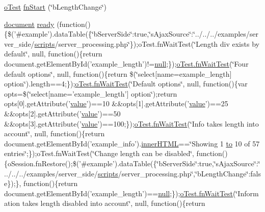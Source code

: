 \begin{DoxyCompactItemize}
\item 
\hyperlink{unit__test_8js_a3b2d259e2df3b6860d9047a92d09d0d6}{o\+Test} \hyperlink{4__server-side_2b_length_change_8js_a7903b4f0c46e3e59ad09c7b0e0f0e72a}{fn\+Start} (\char`\"{}b\+Length\+Change\char`\"{})
\item 
\hyperlink{outside_events_8js_aa14f8e0338cced6720590fd2ea13bd4b}{document} \hyperlink{4__server-side_2b_length_change_8js_a5ece6c457e0732046500cebbf338d1a3}{ready} (function()\{\$('\#example').data\+Table(\{\char`\"{}b\+Server\+Side\char`\"{}\+:true,\char`\"{}s\+Ajax\+Source\char`\"{}\+:\char`\"{}../../../examples/server\+\_\+side/\hyperlink{tinymce_8jquery_8dev_8js_a09066d4d580eeec222f858d588b4cdef}{scripts}/server\+\_\+processing.\+php\char`\"{}\});o\+Test.\+fn\+Wait\+Test(\char`\"{}Length div exists by default\char`\"{}, null, function()\{return document.\+get\+Element\+By\+Id('example\+\_\+length')!=\hyperlink{validate_8js_afb8e110345c45e74478894341ab6b28e}{null};\});\hyperlink{onhold_24__server-side_2__zero__config_8js_ab25c4d596771c0133cdc45178ce72c3d}{o\+Test.\+fn\+Wait\+Test}(\char`\"{}Four default options\char`\"{}, null, function()\{return \$(\char`\"{}select\mbox{[}name=example\+\_\+length\mbox{]} option\char`\"{}).length==4;\});\hyperlink{onhold_24__server-side_2__zero__config_8js_ab25c4d596771c0133cdc45178ce72c3d}{o\+Test.\+fn\+Wait\+Test}(\char`\"{}Default options\char`\"{}, null, function()\{var opts=\$(\char`\"{}select\mbox{[}name='example\+\_\+length'\mbox{]} option\char`\"{});return opts\mbox{[}0\mbox{]}.get\+Attribute('\hyperlink{fullpage_2plugin_8min_8js_ac56c57897e10f699d124e0103921aa20}{value}')==10 \&\&opts\mbox{[}1\mbox{]}.get\+Attribute('\hyperlink{fullpage_2plugin_8min_8js_ac56c57897e10f699d124e0103921aa20}{value}')==25 \&\&opts\mbox{[}2\mbox{]}.get\+Attribute('\hyperlink{fullpage_2plugin_8min_8js_ac56c57897e10f699d124e0103921aa20}{value}')==50 \&\&opts\mbox{[}3\mbox{]}.get\+Attribute('\hyperlink{fullpage_2plugin_8min_8js_ac56c57897e10f699d124e0103921aa20}{value}')==100;\});\hyperlink{onhold_24__server-side_2__zero__config_8js_ab25c4d596771c0133cdc45178ce72c3d}{o\+Test.\+fn\+Wait\+Test}(\char`\"{}Info takes length into account\char`\"{}, null, function()\{return document.\+get\+Element\+By\+Id('example\+\_\+info').\hyperlink{jquery-ui_8js_a87f73c4f0391c1cf9fe60374a76d9a7b}{inner\+H\+T\+M\+L}==\char`\"{}Showing 1 \hyperlink{jquery-ui_8js_af6086621f45baa2cf538f19e45d3c263}{to} 10 of 57 entries\char`\"{};\});o\+Test.\+fn\+Wait\+Test(\char`\"{}Change length can be disabled\char`\"{}, function()\{o\+Session.\+fn\+Restore();\$('\#example').data\+Table(\{\char`\"{}b\+Server\+Side\char`\"{}\+:true,\char`\"{}s\+Ajax\+Source\char`\"{}\+:\char`\"{}../../../examples/server\+\_\+side/\hyperlink{tinymce_8jquery_8dev_8js_a09066d4d580eeec222f858d588b4cdef}{scripts}/server\+\_\+processing.\+php\char`\"{},\char`\"{}b\+Length\+Change\char`\"{}\+:false\});\}, function()\{return document.\+get\+Element\+By\+Id('example\+\_\+length')==\hyperlink{validate_8js_afb8e110345c45e74478894341ab6b28e}{null};\});\hyperlink{onhold_24__server-side_2__zero__config_8js_ab25c4d596771c0133cdc45178ce72c3d}{o\+Test.\+fn\+Wait\+Test}(\char`\"{}Information takes length disabled into account\char`\"{}, null, function()\{return 
\end{DoxyCompactItemize}
